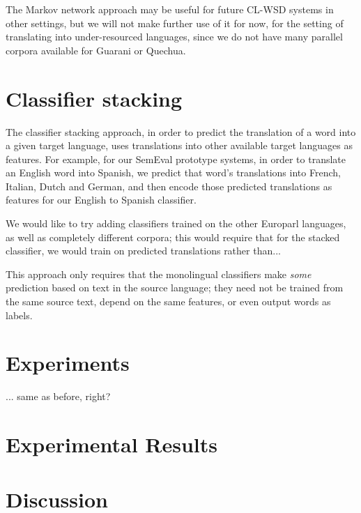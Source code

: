 The Markov network approach may be useful for future CL-WSD systems in other
settings, but we will not make further use of it for now, for the setting of
translating into under-resourced languages, since we do not have many parallel
corpora available for Guarani or Quechua.

\section{Classifier stacking}
The classifier stacking approach, in order to predict the translation of a word
into a given target language, uses translations into other available target
languages as features.
For example, for our SemEval prototype systems, in order to translate an
English word into Spanish, we predict that word's translations into French,
Italian, Dutch and German, and then encode those predicted translations as
features for our English to Spanish classifier.


We would like to try adding classifiers trained on the other Europarl
languages, as well as completely different corpora; this would require that for
the stacked classifier, we would train on predicted translations rather than...

This approach only requires that the monolingual classifiers make \emph{some}
prediction based on text in the source language; they need not be trained from
the same source text, depend on the same features, or even output words as
labels.

\section{Experiments}
\label{sec:multilingual-experiments}
... same as before, right?

\section{Experimental Results}
\label{sec:multilingual-results}

\section{Discussion}

